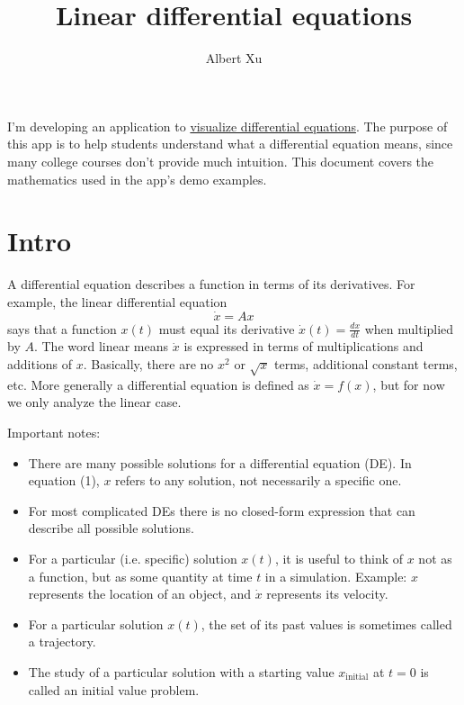 \documentclass[11pt, oneside]{article}   	%
\title{Linear differential equations}
\author{Albert Xu}
\begin{document}
\maketitle

I'm developing an application to \href{https://github.com/alberttxu/diffeqvisualizer}{visualize differential equations}.
The purpose of this app is to help students understand what a differential equation means,
since many college courses don't provide much intuition.
This document covers the mathematics used in the app's demo examples.

\section{Intro}

A differential equation describes a function in terms of its derivatives.
For example, the linear differential equation
\begin{equation}
\dot{x} = Ax
\end{equation}
says that a function $x(t)$ must equal its derivative $\dot{x}(t) = \frac{dx}{dt}$ when multiplied by $A$.
The word linear means $\dot{x}$ is expressed in terms of multiplications and additions of $x$.
Basically, there are no $x^2$ or $\sqrt{x}$ terms, additional constant terms, etc.
More generally a differential equation is defined as $\dot{x} = f(x)$,
but for now we only analyze the linear case.

Important notes:
\begin{itemize}
  \item There are many possible solutions for a differential equation (DE).
  In equation (1), $x$ refers to any solution, not necessarily a specific one.
  \item For most complicated DEs there is no closed-form expression that can describe all possible solutions.
  \item For a particular (i.e. specific) solution $x(t)$, it is useful to think of $x$ not as a function, but as some quantity at time $t$ in a simulation.
    \subitem Example: $x$ represents the location of an object, and $\dot{x}$ represents its velocity.
  \item For a particular solution $x(t)$, the set of its past values is sometimes called a trajectory.
  \item The study of a particular solution with a starting value $x_\mathrm{initial}$ at $t = 0$ is called an initial value problem.
\end{itemize}
\end{document}
